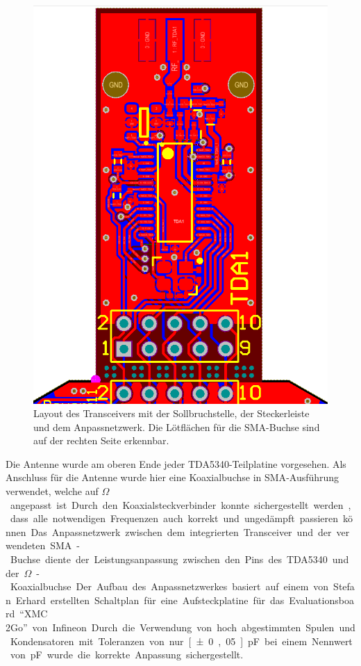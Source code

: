 \begin{figure}[h]
\centering
\includegraphics[trim=4.3cm 0cm 4.4cm 0cm, clip=true, totalheight=0.5\textheight,angle=-90]{Abbildungen/Aufnahmen/Bilder/Altium/TDA}
\caption{Layout des Transceivers mit der Sollbruchstelle, der Steckerleiste und dem Anpassnetzwerk. Die Lötflächen für die SMA-Buchse sind auf der rechten Seite erkennbar.}
\label{fig:tdalayout}
\end{figure}

 
Die Antenne wurde am oberen Ende jeder TDA5340-Teilplatine vorgesehen. Als Anschluss für die Antenne wurde hier eine Koaxialbuchse in \ac{SMA}-Ausführung verwendet, welche auf \unit[50]{$\Omega$} angepasst ist. Durch den Koaxialsteckverbinder konnte sichergestellt werden, dass alle notwendigen Frequenzen auch korrekt und ungedämpft passieren können. 
Das Anpassnetzwerk zwischen dem  integrierten Transceiver und der verwendeten \ac{SMA}-Buchse diente der Leistungsanpassung zwischen den Pins des TDA5340 und der \unit[50]{$\Omega$}-Koaxialbuchse. Der Aufbau des Anpassnetzwerkes basiert auf einem von Stefan Erhard erstellten Schaltplan für eine Aufsteckplatine für das Evaluationsboard \enquote{XMC 2Go} von Infineon. Durch die Verwendung von hoch abgestimmten Spulen und Kondensatoren mit Toleranzen von nur \unit[±0,05]{pF} bei einem Nennwert von \unit[2,5]{pF} wurde die korrekte Anpassung sichergestellt. 
 


